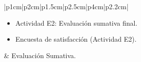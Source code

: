 \documentclass[12pt]{article}
\begin{document}
\begin{longtable}{|p{1cm}|p{2cm}|p{1.5cm}|p{2.5cm}|p{4cm}|p{2.2cm}|}
\begin{minipage}[H]{1.0\linewidth}
                                             \begin{itemize}[leftmargin=8pt]

                                            \item Actividad E2: Evaluación sumativa final.
                                            \item Encuesta de satisfacción (Actividad E2). 

                                            \end{itemize}
                                                                                    \vspace{4pt}

                                            \end{minipage} & Evaluación Sumativa.
                                              \\ \hline


\end{longtable}
\end{document}
